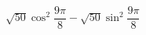 \begin{ex}[type=calculate]
	\begin{condition}
		\( \sqrt{50}\cos^2\dfrac{9\pi}{8}-\sqrt{50}\sin^2\dfrac{9\pi}{8} \)
	\end{condition}
\end{ex}